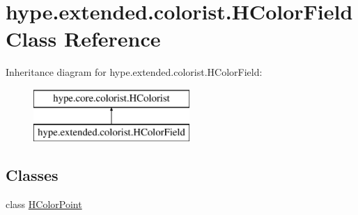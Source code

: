 \hypertarget{classhype_1_1extended_1_1colorist_1_1_h_color_field}{\section{hype.\-extended.\-colorist.\-H\-Color\-Field Class Reference}
\label{classhype_1_1extended_1_1colorist_1_1_h_color_field}
}
Inheritance diagram for hype.\-extended.\-colorist.\-H\-Color\-Field\-:\begin{figure}[H]
\begin{center}
\leavevmode
\includegraphics[height=2.000000cm]{classhype_1_1extended_1_1colorist_1_1_h_color_field}
\end{center}
\end{figure}
\subsection*{Classes}
\begin{DoxyCompactItemize}
\item 
class \hyperlink{classhype_1_1extended_1_1colorist_1_1_h_color_field_1_1_h_color_point}{H\-Color\-Point}
\end{DoxyCompactItemize}
